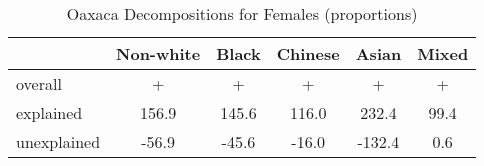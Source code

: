 \begin{table}[htbp]\centering
\caption{Oaxaca Decompositions for Females (proportions)}
\begin{tabular}{l*{5}{c}}
\hline\hline
          &Non-white&    Black&  Chinese&    Asian&    Mixed\\
\hline
overall   &    +     &      +   &   +      &    +     &     +    \\
explained &    156.9\sym{***}&    145.6\sym{***}&    116.0\sym{***}&    232.4\sym{***}&     99.4\sym{***}\\
unexplained&    -56.9\sym{***}&    -45.6\sym{***}&    -16.0&   -132.4\sym{***}&      0.6\\
\hline\hline
\end{tabular}
\label{tab:oaxaca_pct_female}
\end{table}
